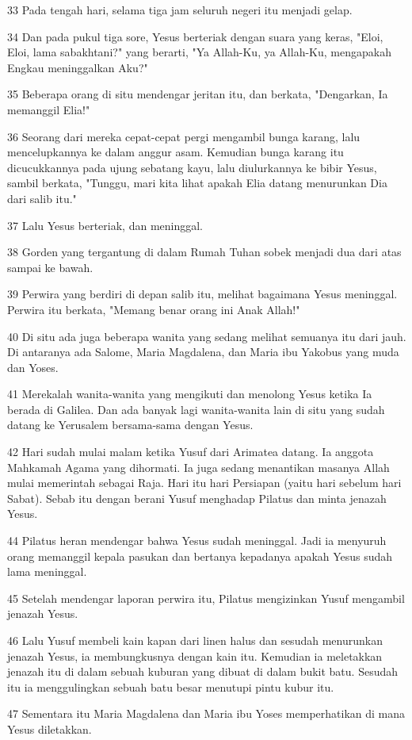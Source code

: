 \par 33 Pada tengah hari, selama tiga jam seluruh negeri itu menjadi gelap.
\par 34 Dan pada pukul tiga sore, Yesus berteriak dengan suara yang keras, "Eloi, Eloi, lama sabakhtani?" yang berarti, "Ya Allah-Ku, ya Allah-Ku, mengapakah Engkau meninggalkan Aku?"
\par 35 Beberapa orang di situ mendengar jeritan itu, dan berkata, "Dengarkan, Ia memanggil Elia!"
\par 36 Seorang dari mereka cepat-cepat pergi mengambil bunga karang, lalu mencelupkannya ke dalam anggur asam. Kemudian bunga karang itu dicucukkannya pada ujung sebatang kayu, lalu diulurkannya ke bibir Yesus, sambil berkata, "Tunggu, mari kita lihat apakah Elia datang menurunkan Dia dari salib itu."
\par 37 Lalu Yesus berteriak, dan meninggal.
\par 38 Gorden yang tergantung di dalam Rumah Tuhan sobek menjadi dua dari atas sampai ke bawah.
\par 39 Perwira yang berdiri di depan salib itu, melihat bagaimana Yesus meninggal. Perwira itu berkata, "Memang benar orang ini Anak Allah!"
\par 40 Di situ ada juga beberapa wanita yang sedang melihat semuanya itu dari jauh. Di antaranya ada Salome, Maria Magdalena, dan Maria ibu Yakobus yang muda dan Yoses.
\par 41 Merekalah wanita-wanita yang mengikuti dan menolong Yesus ketika Ia berada di Galilea. Dan ada banyak lagi wanita-wanita lain di situ yang sudah datang ke Yerusalem bersama-sama dengan Yesus.
\par 42 Hari sudah mulai malam ketika Yusuf dari Arimatea datang. Ia anggota Mahkamah Agama yang dihormati. Ia juga sedang menantikan masanya Allah mulai memerintah sebagai Raja. Hari itu hari Persiapan (yaitu hari sebelum hari Sabat). Sebab itu dengan berani Yusuf menghadap Pilatus dan minta jenazah Yesus.
\par 44 Pilatus heran mendengar bahwa Yesus sudah meninggal. Jadi ia menyuruh orang memanggil kepala pasukan dan bertanya kepadanya apakah Yesus sudah lama meninggal.
\par 45 Setelah mendengar laporan perwira itu, Pilatus mengizinkan Yusuf mengambil jenazah Yesus.
\par 46 Lalu Yusuf membeli kain kapan dari linen halus dan sesudah menurunkan jenazah Yesus, ia membungkusnya dengan kain itu. Kemudian ia meletakkan jenazah itu di dalam sebuah kuburan yang dibuat di dalam bukit batu. Sesudah itu ia menggulingkan sebuah batu besar menutupi pintu kubur itu.
\par 47 Sementara itu Maria Magdalena dan Maria ibu Yoses memperhatikan di mana Yesus diletakkan.

